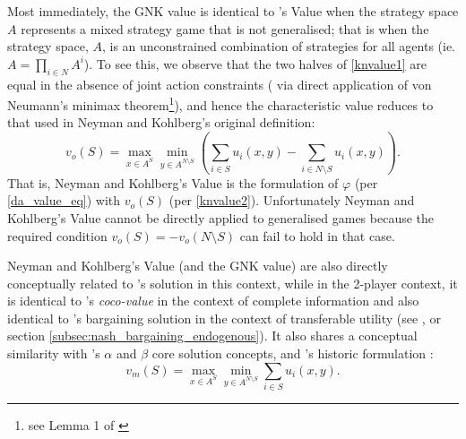 Most immediately, the GNK value is identical to \cite{value2}'s Value when the strategy space $A$ represents a mixed strategy game that is not generalised; that is when the strategy space, $A$, is an unconstrained combination of strategies for all agents (ie. $A = \prod_{i\in N}A^i$).
To see this, we observe that the two halves of \eqref{knvalue1} are equal in the absence of joint action constraints (%
via direct application of von Neumann's minimax theorem\footnote{see Lemma 1 of \cite{value2}}), 
and hence the characteristic value reduces to that used in Neyman and Kohlberg's original definition:
\begin{equation}\label{knvalue2}v_o(S) = \max_{x\in A^S}\min_{y\in A^{N\setminus S}} \left(\sum_{i\in S} u_i(x,y) - \sum_{i\in N\setminus S} u_i(x,y) \right).\end{equation}
%
That is, Neyman and Kohlberg's Value is the formulation of $\varphi$ (per \eqref{da_value_eq}) 
with $v_o(S)$ (per \eqref{knvalue2}).
Unfortunately Neyman and Kohlberg's Value cannot be directly applied to generalised games because the required condition $v_o(S)=-v_o(N\setminus S)$ can fail to hold in that case. 

Neyman and Kohlberg's Value (and the GNK value) are also directly conceptually related to \cite{values3}'s solution in this context,
while in the 2-player context, it is identical to \cite{kalai1,Kalai2010}'s \textit{coco-value} in the context of complete information  
and also identical to \cite{nash2}'s bargaining solution in the context of transferable utility (see \cite{value2}, or section \ref{subsec:nash_bargaining_endogenous}).
It also shares a conceptual similarity with \cite{aumann1961core}'s $\alpha$ and $\beta$ core solution concepts, and \cite{1944}'s historic formulation :
\begin{equation}\label{knvalue3}v_m(S) = \max_{x\in A^S}\min_{y\in A^{N\setminus S}} \sum_{i\in S} u_i(x,y).\end{equation}
\DIFaddbegin {}


